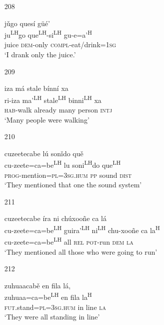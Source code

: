 \begin{itemize}
\item [208]

\glll j\v{u}go ques\'{i} g\"{u}\'{e}' \\
ju\textsuperscript{LH}go que\textsuperscript{LH}-si\textsuperscript{LH} gu-e=a'\textsuperscript{H} \\
juice \textsc{dem}-only \textsc{compl}-eat/drink=\textsc{1sg} \\
\glt `I drank only the juice.'  



\item[209]
 
\glll   iza m\'{a} stale b\'{i}nn\'{i} xa \\
ri-iza ma'\textsuperscript{LH} stale\textsuperscript{LH} binni\textsuperscript{LH} xa \\
\textsc{hab}-walk already many person \textsc{intj} \\
\glt `Many people were walking'
 


\item[210]
 
\glll   cuzeetecabe l\'{u} son\v{i}do qu\v{e} \\
 cu-zeete=ca=be\textsuperscript{LH} lu soni\textsuperscript{LH}do que\textsuperscript{LH} \\
\textsc{prog}-mention=\textsc{pl}=\textsc{3sg.hum} \textsc{pp} sound \textsc{dist} \\
\glt `They mentioned that one the sound system'
 



\item[211]
 
\glll   cuzeetecabe \'{i}ra ni ch\'{u}xoo\~{n}e ca l\'{a} \\
cu-zeete=ca=be\textsuperscript{LH} guira'\textsuperscript{LH} ni\textsuperscript{LH} chu-xoo\~{n}e ca la\textsuperscript{H} \\
cu-zeete=ca=be\textsuperscript{LH} all \textsc{rel} \textsc{pot}-run \textsc{dem} \textsc{la} \\
\glt `They mentioned all those who were going to run'
 


\item[212]
 
\glll   zuhuaacab\v{e} en fila l\'{a},  \\
zuhuaa=ca=be\textsuperscript{LH}  en fila la\textsuperscript{H} \\
\textsc{fut}.stand=\textsc{pl}=\textsc{3sg.hum} in line \textsc{la} \\
\glt `They were all standing in line'
 



\end{itemize}
